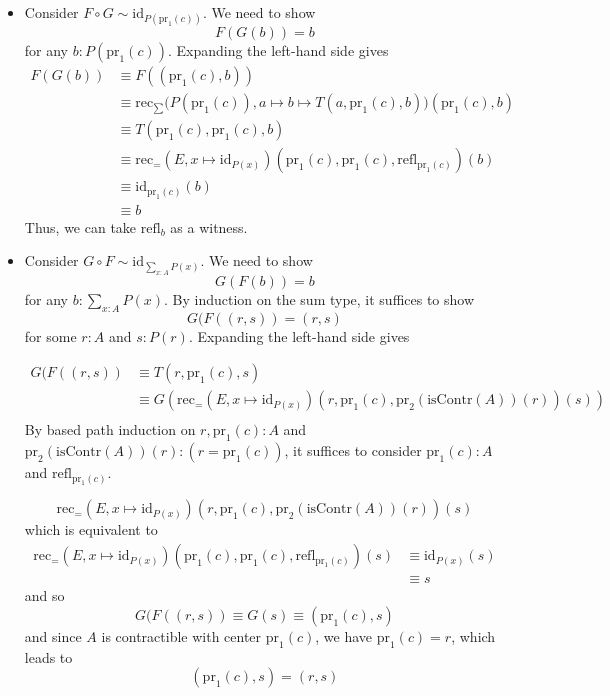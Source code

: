 \documentclass[14pt]{extarticle}
\newcommand{\0}{{\mathbf 0}}
\newcommand{\1}{{\mathbf 1}}
\newcommand{\2}{{\mathbf 2}}
\newcommand{\mt}{\mapsto}
\newcommand{\rec}{\mathrm{rec}}
\newcommand{\refl}{\mathrm{refl}}
\newcommand{\pr}{\mathrm{pr}}
\newcommand{\id}{\mathrm{id}}
\newcommand{\isContr}{\mathrm{isContr}}
\begin{document}
\begin{itemize}
\item Consider $F \circ G \sim \id_{P(\pr_1(c))}$. We need to show 
\[F(G(b)) = b\] for any $b : P(\pr_1(c))$. Expanding the left-hand side gives
\begin{align*}
F(G(b)) &\equiv F((\pr_1(c),b)) \\
&\equiv \rec_{\sum}\Big(P(\pr_1(c)), a \mt b \mt T(a,\pr_1(c),b)\Big)(\pr_1(c),b) \\
&\equiv T(\pr_1(c),\pr_1(c),b)\\
&\equiv \rec_{=}(E,x \mt \id_{P(x)})(\pr_1(c),\pr_1(c), \refl_{\pr_1(c)})(b)\\
&\equiv \id_{\pr_1(c)}(b)\\
&\equiv b
\end{align*}
Thus, we can take $\refl_b$ as a witness.

\item Consider $G \circ F \sim \id_{\sum_{x:A}P(x)}$. We need to show 
\[G(F(b)) = b\] for any $b : \sum_{x:A}P(x)$. By induction on the sum type, it suffices to show
\[G(F((r,s)) = (r,s)\] for some $r : A$ and $s : P(r)$.
Expanding the left-hand side gives

\begin{align*}
G(F((r,s)) &\equiv T(r,\pr_1(c),s) \\
&\equiv G(\rec_{=}(E,x \mt \id_{P(x)})(r,\pr_1(c), \pr_2(\isContr(A))(r))(s)) \\
\end{align*}
By based path induction on $r,\pr_1(c) : A$ and $\pr_2(\isContr(A))(r) : (r = \pr_1(c))$, it suffices to consider $\pr_1(c) : A$ and $\refl_{\pr_1(c)}$.

\[
\rec_{=}(E,x \mt \id_{P(x)})(r,\pr_1(c), \pr_2(\isContr(A))(r))(s) \]
which is equivalent to   
\begin{align*}
\rec_{=}(E,x \mt \id_{P(x)})(\pr_1(c),\pr_1(c), \refl_{\pr_1(c)})(s)
&\equiv \id_{P(x)}(s)\\
&\equiv s
\end{align*}
and so \[G(F((r,s)) \equiv G(s) \equiv (\pr_1(c),s)\] and since $A$ is contractible with center $\pr_1(c)$, we have $\pr_1(c) = r$, which leads to
\[(\pr_1(c),s) = (r,s)\]

\end{itemize}
\end{document}

